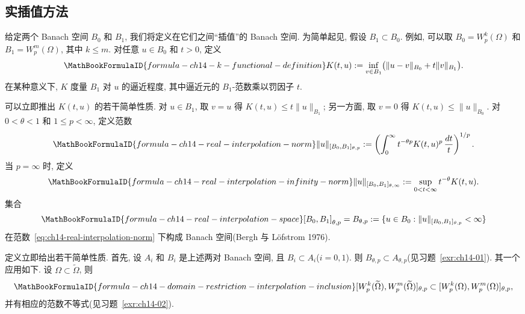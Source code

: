 \subsection{实插值方法}
\label{sec:ch14-real-interpolation-method}
\setcounter{thmcount}{0}
\setcounter{equation}{0}

给定两个 Banach 空间 $B_0$ 和 $B_1$, 我们将定义在它们之间``插值''的 Banach 空间. 为简单起见, 假设 $B_1\subset B_0$. 例如, 可以取 $B_0=W_p^k(\Omega)$ 和 $B_1=W_p^m(\Omega)$, 其中 $k\leq m$. 对任意 $u\in B_0$ 和 $t>0$, 定义
\[
\MathBookFormulaID{formula-ch14-k-functional-definition}
K(t,u):=\inf_{v\in B_1}\bigl(\|u-v\|_{B_0}+t\|v\|_{B_1}\bigr).
\]
在某种意义下, $K$ 度量 $B_1$ 对 $u$ 的逼近程度, 其中逼近元的 $B_1$-范数乘以罚因子 $t$.

可以立即推出 $K(t,u)$ 的若干简单性质. 对 $u\in B_1$, 取 $v=u$ 得 $K(t,u)\leq t\|u\|_{B_1}$; 另一方面, 取 $v=0$ 得 $K(t,u)\leq\|u\|_{B_0}$. 对 $0<\theta<1$ 和 $1\leq p<\infty$, 定义范数
\begin{equation}
\MathBookFormulaID{formula-ch14-real-interpolation-norm}
\label{eq:ch14-real-interpolation-norm}
\|u\|_{[B_0,B_1]_{\theta,p}}
:=\left(\int_0^\infty t^{-\theta p}K(t,u)^p\,\frac{dt}{t}\right)^{1/p}.
\end{equation}
当 $p=\infty$ 时, 定义
\[
\MathBookFormulaID{formula-ch14-real-interpolation-infinity-norm}
\|u\|_{[B_0,B_1]_{\theta,\infty}}
:=\sup_{0<t<\infty}t^{-\theta}K(t,u).
\]
集合
\[
\MathBookFormulaID{formula-ch14-real-interpolation-space}
[B_0,B_1]_{\theta,p}=B_{\theta,p}
:=\{u\in B_0:\|u\|_{[B_0,B_1]_{\theta,p}}<\infty\}
\]
在范数~\eqref{eq:ch14-real-interpolation-norm} 下构成 Banach 空间(Bergh 与 Löfstrom 1976).

定义立即给出若干简单性质. 首先, 设 $A_i$ 和 $B_i$ 是上述两对 Banach 空间, 且 $B_i\subset A_i$($i=0,1$). 则 $B_{\theta,p}\subset A_{\theta,p}$(见习题~\ref{exr:ch14-01}). 其一个应用如下. 设 $\Omega\subset\widetilde\Omega$, 则
\begin{equation}
\MathBookFormulaID{formula-ch14-domain-restriction-interpolation-inclusion}
\label{eq:ch14-domain-restriction-interpolation-inclusion}
[W_p^k(\widetilde\Omega),W_p^m(\widetilde\Omega)]_{\theta,p}
\subset [W_p^k(\Omega),W_p^m(\Omega)]_{\theta,p},
\end{equation}
并有相应的范数不等式(见习题~\ref{exr:ch14-02}).

